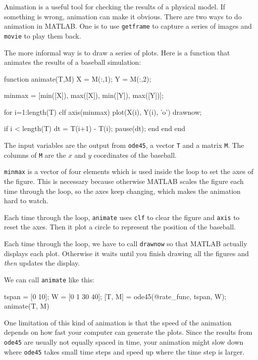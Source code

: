 \documentclass[
]{book}
\numberwithin{Answer}{chapter}
\numberwithin{Exercise}{chapter}
\begin{document}
Animation is a useful tool for checking the results of a physical
model.  If something is wrong, animation can make it obvious.
There are two ways to do animation in MATLAB.  One is to use
{\tt getframe} to capture a series of images and {\tt movie} to
play them back.

The more informal way is to draw a series of plots.  Here is a function that animates the results of a baseball simulation:

\begin{code}
function animate(T,M)
    X = M(:,1);
    Y = M(:,2);

    minmax = [min([X]), max([X]), min([Y]), max([Y])];

    for i=1:length(T)
        clf
        axis(minmax)
        plot(X(i), Y(i), 'o')
        drawnow;
        
        if i < length(T)
            dt = T(i+1) - T(i);
            pause(dt);
        end
    end
end
\end{code}

The input variables are the output from {\tt ode45}, a vector
{\tt T} and a matrix {\tt M}.  The columns of {\tt M} are the
$x$ and $y$ coordinates of the baseball.

{\tt minmax} is a vector of four elements which is used inside
the loop to set the axes of the figure.  This is necessary because
otherwise MATLAB scales the figure each time through the loop,
so the axes keep changing, which makes the animation hard
to watch.

Each time through the loop, {\tt animate} uses {\tt clf}
to clear the figure and {\tt axis} to reset the axes.  Then it plot a circle to represent the position of the baseball.

Each time through the loop, we have to call {\tt drawnow} so
that MATLAB actually displays each plot.  Otherwise it waits
until you finish drawing all the figures and {\em then} updates
the display.

We can call {\tt animate} like this:

\begin{code}
    tspan = [0 10];
    W = [0 1 30 40];
    [T, M] = ode45(@rate_func, tspan, W);
    animate(T, M)
\end{code}

One limitation of this kind of animation is that the speed
of the animation depends on how fast your computer can generate
the plots.  Since the results from {\tt ode45} are usually not
equally spaced in time, your animation might slow down where
{\tt ode45} takes small time steps and speed up where the time
step is larger.
\end{document}
